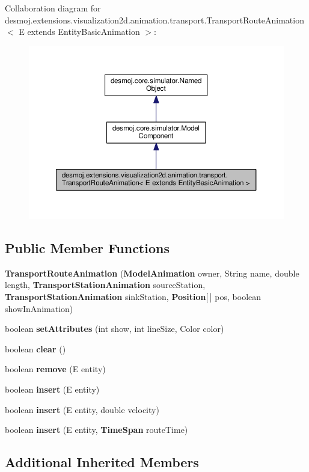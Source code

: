 Collaboration diagram for desmoj.\-extensions.\-visualization2d.\-animation.\-transport.\-Transport\-Route\-Animation$<$ E extends Entity\-Basic\-Animation $>$\-:
\nopagebreak
\begin{figure}[H]
\begin{center}
\leavevmode
\includegraphics[width=350pt]{classdesmoj_1_1extensions_1_1visualization2d_1_1animation_1_1transport_1_1_transport_route_anima15acadd72c4a8603ef403db17a9f81c1}
\end{center}
\end{figure}
\subsection*{Public Member Functions}
\begin{DoxyCompactItemize}
\item 
{\bf Transport\-Route\-Animation} ({\bf Model\-Animation} owner, String name, double length, {\bf Transport\-Station\-Animation} source\-Station, {\bf Transport\-Station\-Animation} sink\-Station, {\bf Position}[$\,$] pos, boolean show\-In\-Animation)
\item 
boolean {\bf set\-Attributes} (int show, int line\-Size, Color color)
\item 
boolean {\bf clear} ()
\item 
boolean {\bf remove} (E entity)
\item 
boolean {\bf insert} (E entity)
\item 
boolean {\bf insert} (E entity, double velocity)
\item 
boolean {\bf insert} (E entity, {\bf Time\-Span} route\-Time)
\end{DoxyCompactItemize}
\subsection*{Additional Inherited Members}


